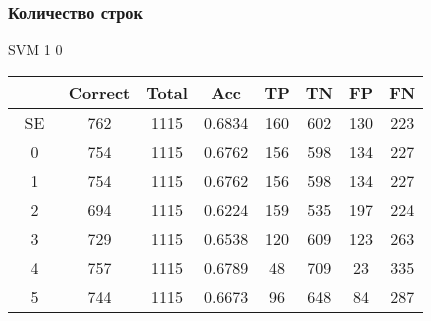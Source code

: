 \documentclass[a4paper, 12pt]{article}
\theoremstyle{plain}
\theoremstyle{definition}
\theoremstyle{remark}
\begin{document}
\subsubsection{Количество строк}
SVM 1 0

\begin{tabular}{|c|c|c|c|c|c|c|c|}
\hline
  ~~~~ & Correct & Total & Acc & TP & TN & FP & FN \\
  \hline
  SE & 762 & 1115 & 0.6834 & 160 & 602 & 130 & 223  \\
  \hline
  0 & 754 & 1115 & 0.6762 & 156 & 598 & 134 & 227  \\
  \hline
  1 & 754 & 1115 & 0.6762 & 156 & 598 & 134 & 227  \\
  \hline
  2 & 694 & 1115 & 0.6224 & 159 & 535 & 197 & 224 \\
  \hline
  3 & 729 & 1115 & 0.6538 & 120 & 609 & 123 & 263 \\
  \hline
  4 & 757 & 1115 & 0.6789 & 48 & 709 & 23 & 335 \\
  \hline
  5 & 744 & 1115 & 0.6673 & 96 & 648 & 84 & 287 \\
\hline
\end{tabular}
\end{document}
